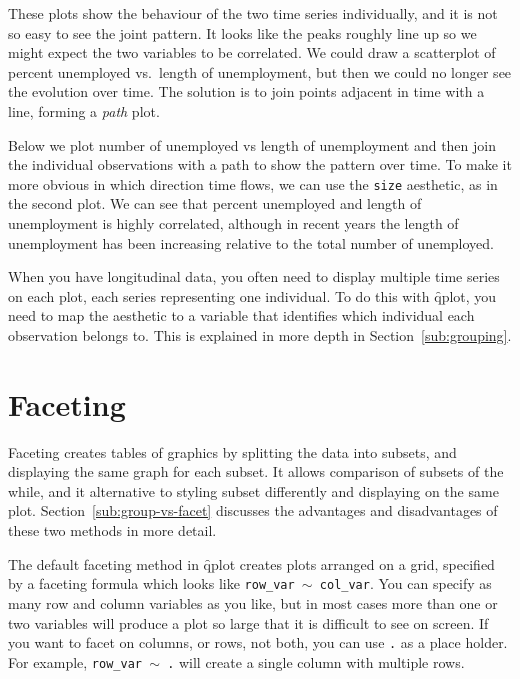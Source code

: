 These plots show the behaviour of the two time series individually, and it is not so easy to see the joint pattern.  It looks like the peaks roughly line up so we might expect the two variables to be correlated. We could draw a scatterplot of percent unemployed vs.\ length of unemployment, but then we could no longer see the evolution over time.  The solution is to join points adjacent in time with a line, forming a \emph{path} plot.

Below we plot number of unemployed vs length of unemployment and then join the individual observations with a path to show the pattern over time.  To make it more obvious in which direction time flows, we can use the {\tt size} aesthetic, as in the second plot.  We can see that percent unemployed and length of unemployment is highly correlated, although in recent years the length of unemployment has been increasing relative to the total number of unemployed.

% 


When you have longitudinal data, you often need to display multiple time series on each plot, each series representing one individual.  To do this with \f{qplot}, you need to map the  aesthetic to a variable that identifies which individual each observation belongs to.  This is explained in more depth in Section~\ref{sub:grouping}.

\section{Faceting}\label{sec:faceting}

Faceting creates tables of graphics by splitting the data into subsets, and displaying the same graph for each subset.  It allows comparison of subsets of the while, and it alternative to styling subset differently and displaying on the same plot.  Section~\ref{sub:group-vs-facet} discusses the advantages and disadvantages of these two methods in more detail.  

The default faceting method in \f{qplot} creates plots arranged on a grid, specified by a faceting formula which looks like {\tt row\_var $\sim$ col\_var}.  You can specify as many row and column variables as you like, but in most cases more than one or two variables will produce a plot so large that it is difficult to see on screen.  If you want to facet on columns, or rows, not both, you can use {\tt .} as a place holder.  For example, {\tt row\_var $\sim$ .} will create a single column with multiple rows.  

